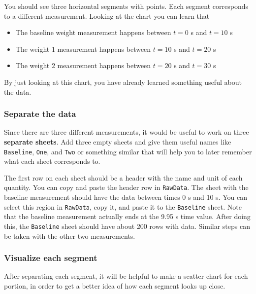You should see three horizontal segments with points. Each segment corresponds to a different measurement. Looking at the chart you can learn that
\begin{itemize}
    \item The baseline weight measurement happens between $t = 0$ s and $t = 10$ s
    \item The weight 1 measurement happens between $t = 10$ s and $t = 20$ s
    \item The weight 2 measurement happens between $t = 20$ s and $t = 30$ s
\end{itemize}
By just looking at this chart, you have already learned something useful about the data.
\begin{center}
\end{center}
\subsubsection{Separate the data}
Since there are three different measurements, it would be useful to work on three \textbf{separate sheets}. Add three empty sheets and give them useful names like \texttt{Baseline}, \texttt{One}, and \texttt{Two} or something similar that will help you to later remember what each sheet corresponds to.

The first row on each sheet should be a header with the name and unit of each quantity. You can copy and paste the header row in \texttt{RawData}. The sheet with the baseline measurement should have the data between times 0 s and 10 s. You can select this region in \texttt{RawData}, copy it, and paste it to the \texttt{Baseline} sheet. Note that the baseline measurement actually ends at the 9.95 s time value. After doing this, the \texttt{Baseline} sheet should have about 200 rows with data. Similar steps can be taken with the other two measurements.
\subsubsection{Visualize each segment}
After separating each segment, it will be helpful to make a scatter chart for each portion, in order to get a better idea of how each segment looks up close.

